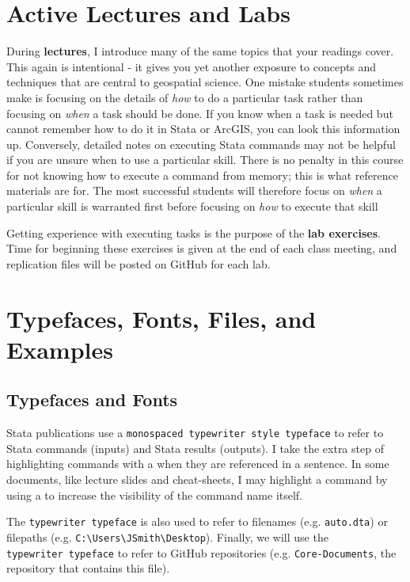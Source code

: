 \documentclass[]{book}
\begin{document}
\section{Active Lectures and Labs}\label{active-lectures-and-labs}

During \textbf{lectures}, I introduce many of the same topics that your
readings cover. This again is intentional - it gives you yet another
exposure to concepts and techniques that are central to geospatial
science. One mistake students sometimes make is focusing on the details
of \emph{how} to do a particular task rather than focusing on
\emph{when} a task should be done. If you know when a task is needed but
cannot remember how to do it in Stata or ArcGIS, you can look this
information up. Conversely, detailed notes on executing Stata commands
may not be helpful if you are unsure when to use a particular skill.
There is no penalty in this course for not knowing how to execute a
command from memory; this is what reference materials are for. The most
successful students will therefore focus on \emph{when} a particular
skill is warranted first before focusing on \emph{how} to execute that
skill

Getting experience with executing tasks is the purpose of the
\textbf{lab exercises}. Time for beginning these exercises is given at
the end of each class meeting, and replication files will be posted on
GitHub for each lab.

\section{Typefaces, Fonts, Files, and
Examples}\label{typefaces-fonts-files-and-examples}

\subsection{Typefaces and Fonts}\label{typefaces-and-fonts}

Stata publications use a
\texttt{monospaced\ typewriter\ style\ typeface} to refer to Stata
commands (inputs) and Stata results (outputs). I take the extra step of
highlighting commands with a when they are referenced in a sentence. In
some documents, like lecture slides and cheat-sheets, I may highlight a
command by using a to increase the visibility of the command name
itself.

The \texttt{typewriter\ typeface} is also used to refer to filenames
(e.g. \texttt{auto.dta}) or filepaths (e.g.
\texttt{C:\textbackslash{}Users\textbackslash{}JSmith\textbackslash{}Desktop}).
Finally, we will use the \texttt{typewriter\ typeface} to refer to
GitHub repositories (e.g. \texttt{Core-Documents}, the repository that
contains this file).
\end{document}
